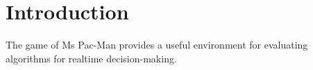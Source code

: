 \chapter{Introduction}
\label{ch:intro}

The game of Ms Pac-Man provides a useful environment for evaluating algorithms for realtime decision-making.  
